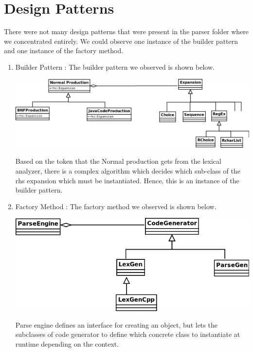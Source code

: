 \documentclass{article}
\begin{document}
\section{Design Patterns}
There were not many design patterns that were present in the parser folder where we concentrated entirely. We could observe one instance of the builder  pattern and one instance of the factory method.
\begin{enumerate}
\item Builder Pattern :
The builder pattern we observed is shown below. 
\begin{center}
\includegraphics[scale=0.35]{builder1.png}
\end{center}
Based on the token that the Normal production gets from the lexical analyzer, there is a complex algorithm which decides which sub-class of the rhs expansion which must be instantiated. Hence, this is an instance of the builder pattern.
\item Factory Method :
The factory method we observed is shown below.
\begin{center}
\includegraphics[scale=0.35]{FactoryMethod1.png}
\end{center}
Parse engine defines an interface for creating an object, but lets the subclasses of code generator to define which concrete class to instantiate at runtime depending on the context.
\end{enumerate}
\end{document}

